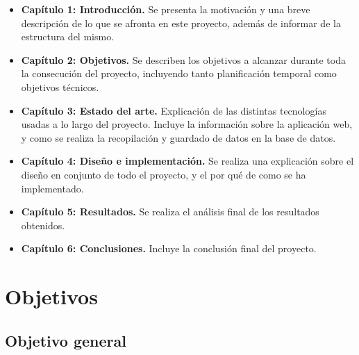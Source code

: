 \documentclass[a4paper, 12pt]{book}
\begin{document}
\begin{itemize}
  \item \textbf{Capítulo 1: Introducción.} Se presenta la motivación y una breve descripción de lo que se afronta en este proyecto, además de informar de la estructura del mismo.

  \item \textbf{Capítulo 2: Objetivos.} Se describen los objetivos a alcanzar durante toda la consecución del proyecto, incluyendo tanto planificación temporal como objetivos técnicos.

  \item \textbf{Capítulo 3: Estado del arte.} Explicación de las distintas tecnologías usadas a lo largo del proyecto. Incluye la información sobre la aplicación web, y como se realiza la recopilación y guardado de datos en la base de datos.

  \item \textbf{Capítulo 4: Diseño e implementación.} Se realiza una explicación sobre el diseño en conjunto de todo el proyecto, y el por qué de como se ha implementado.

  \item \textbf{Capítulo 5: Resultados.} Se realiza el análisis final de los resultados obtenidos.

  \item \textbf{Capítulo 6: Conclusiones.} Incluye la conclusión final del proyecto.

\end{itemize}






\cleardoublepage %
\chapter{Objetivos} %
\label{chap:objetivos} %

\section{Objetivo general} %
\label{sec:objetivo-general} %
\end{document}
